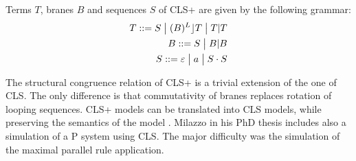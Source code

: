 \begin{definition}
  Terms $T$, branes $B$ and sequences $S$ of CLS+ are given by the following grammar:
  \begin{align*}
    T ::= S \;\big|\; (B)^L\rfloor T \;\big|\; T|T\\
    B ::= S \;\big|\; B|B\\
    S ::= \varepsilon \;\big|\; a \;\big|\; S\cdot S
  \end{align*}
\end{definition}

The structural congruence relation of CLS+ is a trivial extension of the one of CLS. The only difference is that commutativity of branes replaces rotation of looping sequences. CLS+ models can be translated into CLS models, while preserving the semantics of the model \cite{Barbuti07CLS}. Milazzo in his PhD thesis \cite{Milazzo07CLS} includes also a simulation of a P system using CLS. The major difficulty was the simulation of the maximal parallel rule application.



